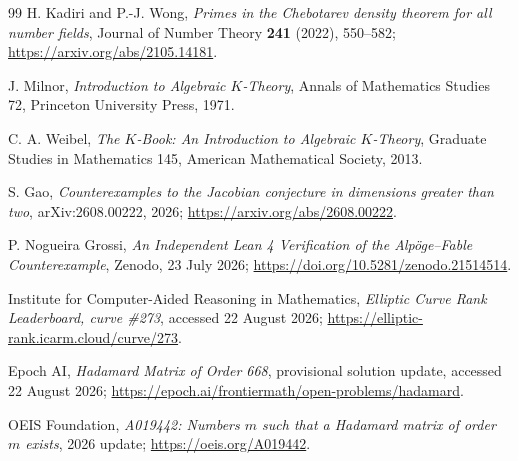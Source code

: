 \documentclass[11pt]{article}
\numberwithin{equation}{section}
\theoremstyle{definition}
\theoremstyle{remark}
\begin{document}
\begin{thebibliography}{99}
H. Kadiri and P.-J. Wong,
\emph{Primes in the Chebotarev density theorem for all number fields},
Journal of Number Theory \textbf{241} (2022), 550--582;
\url{https://arxiv.org/abs/2105.14181}.

J. Milnor,
\emph{Introduction to Algebraic \(K\)-Theory},
Annals of Mathematics Studies 72, Princeton University Press, 1971.

C. A. Weibel,
\emph{The \(K\)-Book: An Introduction to Algebraic \(K\)-Theory},
Graduate Studies in Mathematics 145, American Mathematical Society, 2013.

S. Gao,
\emph{Counterexamples to the Jacobian conjecture in dimensions greater than two},
arXiv:2608.00222, 2026;
\url{https://arxiv.org/abs/2608.00222}.

P. Nogueira Grossi,
\emph{An Independent Lean 4 Verification of the Alp\"oge--Fable Counterexample},
Zenodo, 23 July 2026;
\url{https://doi.org/10.5281/zenodo.21514514}.

Institute for Computer-Aided Reasoning in Mathematics,
\emph{Elliptic Curve Rank Leaderboard, curve \#273},
accessed 22 August 2026;
\url{https://elliptic-rank.icarm.cloud/curve/273}.

Epoch AI,
\emph{Hadamard Matrix of Order 668},
provisional solution update, accessed 22 August 2026;
\url{https://epoch.ai/frontiermath/open-problems/hadamard}.

OEIS Foundation,
\emph{A019442: Numbers \(m\) such that a Hadamard matrix of order \(m\) exists},
2026 update;
\url{https://oeis.org/A019442}.

\end{thebibliography}
\end{document}
